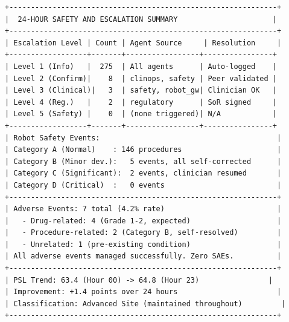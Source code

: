 \begin{verbatim}
+--------------------------------------------------------------+
|  24-HOUR SAFETY AND ESCALATION SUMMARY                      |
+--------------------------------------------------------------+
| Escalation Level | Count | Agent Source     | Resolution     |
+------------------+-------+-----------------+----------------+
| Level 1 (Info)   |  275  | All agents      | Auto-logged    |
| Level 2 (Confirm)|    8  | clinops, safety | Peer validated |
| Level 3 (Clinical)|   3  | safety, robot_gw| Clinician OK   |
| Level 4 (Reg.)   |    2  | regulatory      | SoR signed     |
| Level 5 (Safety) |    0  | (none triggered)| N/A            |
+------------------+-------+-----------------+----------------+
| Robot Safety Events:                                         |
| Category A (Normal)    : 146 procedures                      |
| Category B (Minor dev.):   5 events, all self-corrected      |
| Category C (Significant):  2 events, clinician resumed       |
| Category D (Critical)  :   0 events                          |
+--------------------------------------------------------------+
| Adverse Events: 7 total (4.2% rate)                          |
|   - Drug-related: 4 (Grade 1-2, expected)                    |
|   - Procedure-related: 2 (Category B, self-resolved)         |
|   - Unrelated: 1 (pre-existing condition)                    |
| All adverse events managed successfully. Zero SAEs.          |
+--------------------------------------------------------------+
| PSL Trend: 63.4 (Hour 00) -> 64.8 (Hour 23)                |
| Improvement: +1.4 points over 24 hours                       |
| Classification: Advanced Site (maintained throughout)         |
+--------------------------------------------------------------+
\end{verbatim}
